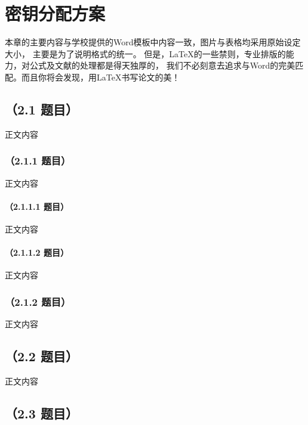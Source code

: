 \chapter{密钥分配方案}

本章的主要内容与学校提供的Word模板中内容一致，图片与表格均采用原始设定大小，%
主要是为了说明格式的统一。%
但是，\LaTeX{}的一些禁则，专业排版的能力，对公式及文献的处理都是得天独厚的，%
我们不必刻意去追求与Word的完美匹配。而且你将会发现，用\LaTeX{}书写论文的美！ %

\section{（2.1 题目）}
正文内容

\subsection{（2.1.1 题目）}
正文内容

\subsubsection{（2.1.1.1 题目）}
正文内容

\subsubsection{（2.1.1.2 题目）}
正文内容

\subsection{（2.1.2 题目）}
正文内容


\section{（2.2 题目）}
正文内容

\section{（2.3 题目）}
